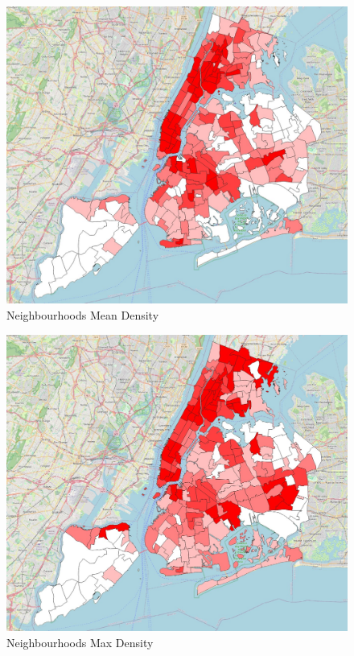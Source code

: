 \documentclass[
  letterpaper,
  DIV=11,
  numbers=noendperiod]{scrreprt}
\begin{document}
\begin{figure}[H]

{\centering \includegraphics{images/lab_13/lab13_fig_neighs_mean_density.jpg}

}

\caption{Neighbourhoods Mean Density}

\end{figure}%
\begin{figure}[H]

{\centering \includegraphics{images/lab_13/lab13_fig_neighs_max_density.jpg}

}

\caption{Neighbourhoods Max Density}

\end{figure}%
\end{document}
